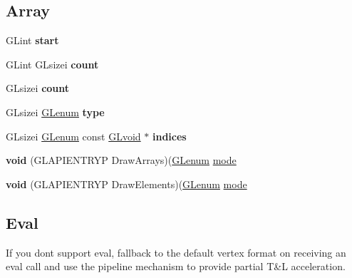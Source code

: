 \subsection*{Array}
\begin{DoxyCompactItemize}
\item 
\mbox{\label{struct_g_lvertexformat_a9f399294cf4c7a9f647d9d51c0c94543}} 
G\+Lint {\bfseries start}
\item 
\mbox{\label{struct_g_lvertexformat_aacfcc1f2a20397de56d9c75f539895c4}} 
G\+Lint G\+Lsizei {\bfseries count}
\item 
\mbox{\label{struct_g_lvertexformat_aebf60001e137ab6c73c178d8fe9bed58}} 
G\+Lsizei {\bfseries count}
\item 
\mbox{\label{struct_g_lvertexformat_a6c2a0870aa37f3dfdeb0e5f3b89cd714}} 
G\+Lsizei \hyperlink{interfacevoid}{G\+Lenum} {\bfseries type}
\item 
\mbox{\label{struct_g_lvertexformat_ac01a60a16da723e746e3c3eef7fcf720}} 
G\+Lsizei \hyperlink{interfacevoid}{G\+Lenum} const \hyperlink{interfacevoid}{G\+Lvoid} $\ast$ {\bfseries indices}
\item 
\mbox{\label{struct_g_lvertexformat_a9ec1e9606ca8c845830ad4a48d4cec6d}} 
{\bfseries void} (G\+L\+A\+P\+I\+E\+N\+T\+R\+YP Draw\+Arrays)(\hyperlink{interfacevoid}{G\+Lenum} \hyperlink{interfacevoid}{mode}
\item 
\mbox{\label{struct_g_lvertexformat_a66d595d87cc52574fcfac2acc697c1ea}} 
{\bfseries void} (G\+L\+A\+P\+I\+E\+N\+T\+R\+YP Draw\+Elements)(\hyperlink{interfacevoid}{G\+Lenum} \hyperlink{interfacevoid}{mode}
\end{DoxyCompactItemize}
\subsection*{Eval}
\label{_amgrp34f8a10ae57ac230a48fc44908bd40ad}%
If you don\textquotesingle{}t support eval, fallback to the default vertex format on receiving an eval call and use the pipeline mechanism to provide partial T\&L acceleration.


